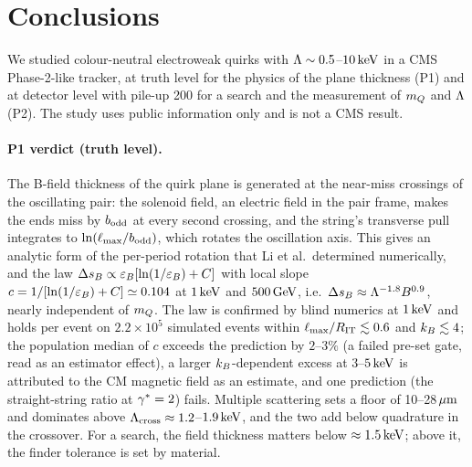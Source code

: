 \section{Conclusions}\label{sec:concl}

We studied colour-neutral electroweak quirks with $\Lambda\sim0.5$--$10\,\mathrm{keV}$ in a CMS Phase-2-like tracker, at truth level for
the physics of the plane thickness (P1) and at detector level with pile-up 200 for a search and the measurement of $m_Q$
and $\Lambda$ (P2). The study uses public information only and is not a CMS result.

\paragraph{P1 verdict (truth level).} The B-field thickness of the quirk plane is generated at the near-miss crossings of the
oscillating pair: the solenoid field, an electric field in the pair frame, makes the ends miss by $b_{\rm odd}$ at every second
crossing, and the string's transverse pull integrates to $\ln(\ell_{\max}/b_{\rm odd})$, which rotates the oscillation axis. This gives
an analytic form of the per-period rotation that Li et al.\ determined numerically, and the law
$\Delta s_B\propto\varepsilon_B[\ln(1/\varepsilon_B)+C]$ with local slope $c=1/[\ln(1/\varepsilon_B)+C]\simeq0.104$ at $1\,\mathrm{keV}$ and $500\,\mathrm{GeV}$, i.e.\
$\Delta s_B\approx\Lambda^{-1.8}B^{0.9}$, nearly independent of $m_Q$. The law is confirmed by blind numerics at $1\,\mathrm{keV}$ and holds per
event on $2.2\times10^5$ simulated events within $\ell_{\max}/R_{\rm IT}\lesssim0.6$ and $k_B\lesssim4$; the population median of $c$
exceeds the prediction by $2$--$3\%$ (a failed pre-set gate, read as an estimator effect), a larger $k_B$-dependent excess at
$3$--$5\,\mathrm{keV}$ is attributed to the CM magnetic field as an estimate, and one prediction (the straight-string ratio at $\gamma^*=2$)
fails. Multiple scattering sets a floor of 10--28$\,\mu\mathrm{m}$ and dominates above $\Lambda_{\rm cross}\approx1.2$--$1.9\,\mathrm{keV}$, and the two add
below quadrature in the crossover. For a search, the field thickness matters below $\approx1.5\,\mathrm{keV}$; above it, the finder
tolerance is set by material.

